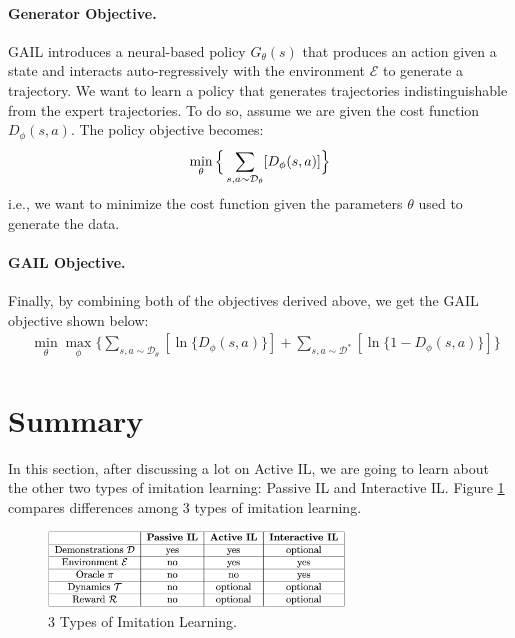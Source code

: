 \documentclass[11pt]{article}
\begin{document}
\paragraph{Generator Objective.} GAIL introduces a neural-based policy $G_\theta (s)$ that produces an action given a state and interacts auto-regressively with the environment $\mathcal{E}$ to generate a trajectory. We want to learn a policy that generates trajectories indistinguishable from the expert trajectories. To do so, assume we are given the cost function $D_\phi(s, a)$. The policy objective becomes:
\begin{equation}
    \label{eq:gail_g}
    \min_{\theta} \Big\{ 
    \sum\limits_{s,a \sim \mathcal{D}_\theta} [D_{\phi}(s, a)] \Big\} \\
\end{equation}
i.e., we want to minimize the cost function given the parameters $\theta$ used to generate the data. 

\paragraph{GAIL Objective.} Finally, by combining both of the objectives derived above, we get the GAIL objective shown below:
\begin{align}
    \label{eq:gail}
    &\min_\theta \max_{\phi} \Big\{ 
    \sum\limits_{s, a\sim \mathcal{D}_\theta} [\ln \{D_{\phi}(s, a)\}] +
    \sum\limits_{s, a\sim \mathcal{D}^\ast} [\ln\{1 - D_{\phi}(s, a)\}] \Big\}
\end{align}

\section{Summary}
In this section, after discussing a lot on Active IL, we are going to learn about the other two types of imitation learning: Passive IL and Interactive IL. Figure \ref{f_3IL} compares differences among 3 types of imitation learning.
\begin{figure}[H]
    \centering
    \includegraphics[width=0.7\textwidth]{images/3IL.png}
    \caption{3 Types of Imitation Learning.}
    \label{f_3IL}
\end{figure}
\end{document}
